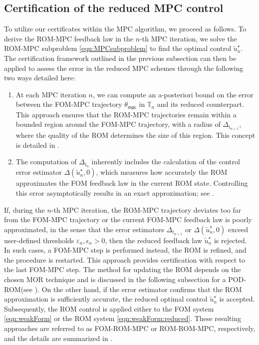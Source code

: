 \documentclass[reqno]{amsart}
\newcommand{\timeInt}{\mathbb{T}}
\newcommand{\state}{\theta}
\newcommand{\inpVar}{u}
\newcommand{\initBound}{\initBoundn{n}}%
\newcommand{\initBoundn}[1]{\Delta_{t_{#1}}}
\newcommand{\stateMPC}{\state_{\mathsf{mpc}}}
\newcommand{\reduce}[1]{\tilde{#1}}
\newcommand{\optInpVarRed}[1]{\reduce{\inpVar}_{#1}^\star}
\newcommand{\optInpVarRedN}{\optInpVarRed{n}}
\newcommand{\abbr}[1]{\textsf{#1}\xspace}
\newcommand{\FOM}{\abbr{FOM}}
\newcommand{\ROM}{\abbr{ROM}}
\newcommand{\MPC}{\abbr{MPC}}
\newcommand{\MOR}{\abbr{MOR}}
\newcommand{\POD}{\abbr{POD}} %
\begin{document}
\subsection{Certification of the reduced \MPC control}
%
\label{subsec:applicationToMPC}
To utilize our certificates within the \MPC algorithm, we proceed as follows. To derive the \ROM-\MPC feedback law in the $n$-th \MPC iteration, we solve the \ROM-\MPC subproblem \eqref{eqn:MPCsubproblem} to find the optimal control $\optInpVarRedN$. The certification framework outlined in the previous subsection can then be applied to assess the error in the reduced \MPC schemes through the following two ways detailed here:
%
\begin{enumerate}
    \item 
    At each \MPC iteration $n$, we can compute an a-posteriori bound on the error between the \FOM-\MPC trajectory $\stateMPC$ in $\timeInt_n$ and its reduced counterpart. This approach ensures that the \ROM-\MPC trajectories remain within a bounded region around the \FOM-\MPC trajectory, with a radius of $\initBoundn{n+1}$, where the quality of the \ROM determines the size of this region. This concept is detailed in .
    \item The computation of $\initBound$ inherently includes the calculation of the control error estimator $\Delta(\optInpVarRedN,0)$, which measures how accurately the \ROM approximates the \FOM feedback law in the current \ROM state. Controlling this error asymptotically results in an exact approximation; see .
\end{enumerate}
%
If, during the $n$-th \MPC iteration, the \ROM-\MPC trajectory deviates too far from the \FOM-\MPC trajectory or the current \FOM-\MPC feedback law is poorly approximated, in the sense that the error estimators $\initBoundn{n+1}$ or $\Delta(\optInpVarRedN,0)$ exceed user-defined thresholds $\varepsilon_n,\epsilon_n>0$, then the reduced feedback law $\optInpVarRedN$ is rejected. In such cases, a \FOM-\MPC step is performed instead, the \ROM is refined, and the procedure is restarted. This approach provides certification with respect to the last \FOM-\MPC step. The method for updating the \ROM depends on the chosen \MOR technique and is discussed in the following subsection for a \POD-\ROM (see ). 
On the other hand, if the error estimator confirms that the \ROM approximation is sufficiently accurate, the reduced optimal control $\optInpVarRedN$ is accepted. Subsequently, the \ROM control is applied either to the \FOM system \eqref{eqn:weakForm} or the \ROM system \eqref{eqn:weakForm:reduced}. These resulting approaches are referred to as \FOM-\ROM-\MPC or \ROM-\ROM-\MPC, respectively, and the details are summarized in .
\end{document}
